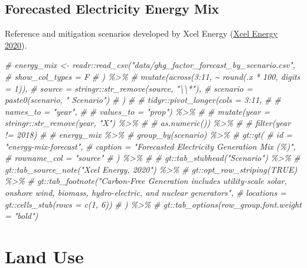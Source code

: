 \documentclass[
]{book}
\newenvironment{Shaded}{\begin{snugshade}}{\end{snugshade}}
\newcommand{\CommentTok}[1]{\textcolor[rgb]{0.56,0.35,0.01}{\textit{#1}}}
\begin{document}
\hypertarget{forecasted-electricity-energy-mix}{%
\subsection{Forecasted Electricity Energy Mix}\label{forecasted-electricity-energy-mix}}

Reference and mitigation scenarios developed by Xcel Energy (\protect\hyperlink{ref-energyUpperMidwestIntegrated2020}{Xcel Energy 2020}).

\begin{Shaded}
\begin{Highlighting}[]
\CommentTok{\# energy\_mix \textless{}{-} readr::read\_csv("data/ghg\_factor\_forecast\_by\_scenario.csv",}
\CommentTok{\#   show\_col\_types = F}
\CommentTok{\# ) \%\textgreater{}\%}
\CommentTok{\#   mutate(across(3:11, \textasciitilde{} round(.x * 100, digits = 1)),}
\CommentTok{\#     source = stringr::str\_remove(source, "\textbackslash{}\textbackslash{}*"),}
\CommentTok{\#     scenario = paste0(scenario, " Scenario")}
\CommentTok{\#   )}
\CommentTok{\# \# tidyr::pivot\_longer(cols = 3:11,}
\CommentTok{\# \#                     names\_to = "year",}
\CommentTok{\# \#                     values\_to = "prop") \%\textgreater{}\%}
\CommentTok{\# \# mutate(year = stringr::str\_remove(year, "X") \%\textgreater{}\%}
\CommentTok{\# \#          as.numeric()) \%\textgreater{}\%}
\CommentTok{\# \# filter(year != 2018)}
\CommentTok{\#}
\CommentTok{\# energy\_mix \%\textgreater{}\%}
\CommentTok{\#   group\_by(scenario) \%\textgreater{}\%}
\CommentTok{\#   gt::gt(}
\CommentTok{\#     id = "energy{-}mix{-}forecast",}
\CommentTok{\#     caption = "Forecasted Electricity Generation Mix (\%)",}
\CommentTok{\#     rowname\_col = "source"}
\CommentTok{\#   ) \%\textgreater{}\%}
\CommentTok{\#   \# gt::tab\_stubhead("Scenario") \%\textgreater{}\%}
\CommentTok{\#   gt::tab\_source\_note("Xcel Energy, 2020") \%\textgreater{}\%}
\CommentTok{\#   gt::opt\_row\_striping(TRUE) \%\textgreater{}\%}
\CommentTok{\#   gt::tab\_footnote("Carbon{-}Free Generation includes utility{-}scale solar, onshore wind, biomass, hydro{-}electric, and nuclear generators",}
\CommentTok{\#     locations = gt::cells\_stub(rows = c(1, 6))}
\CommentTok{\#   ) \%\textgreater{}\%}
\CommentTok{\#   gt::tab\_options(row\_group.font.weight = "bold")}
\end{Highlighting}
\end{Shaded}

\hypertarget{land-use-1}{%
\section{Land Use}\label{land-use-1}}
\end{document}
